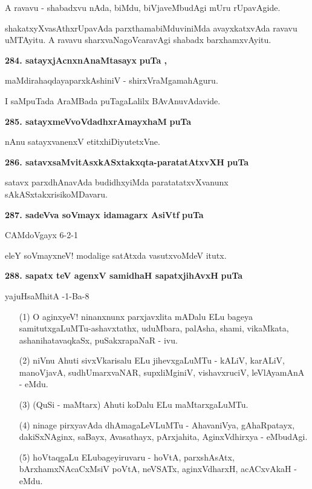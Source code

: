 A ravavu - shabadxvu nAda, biMdu, biVjaveMbudAgi mUru rUpavAgide.

shakatxyXvasAthxrUpavAda parxthamabiMduviniMda avayxkatxvAda ravavu uMTAyitu. A ravavu sharxvaNa\-goVcara\-vAgi shabadx barxhamxvAyitu.

\medskip
\noindent
\textbf{284. satayxjAcnxnAnaMtasayx} \hfill{\bf puTa \pageref{81}, \pageref{103}}

\hfill{maMdirahaqdayaparxkAshiniV - shirxVraMgamahAguru.}

\smallskip
I saMpuTada AraMBada puTagaLalilx BAvAnuvAdavide.

\medskip
\noindent
\textbf{285. satayxmeVvoVdadhxrAmayxhaM} \hfill{\bf puTa \pageref{92}}

\smallskip
nAnu satayxvanenxV etitxhiDiyutetxVne.

\medskip
\noindent
\textbf{286. satavxsaMvitAsxkASxtakxqta-paratatAtxvXH} \hfill{\bf puTa \pageref{48b}}

\smallskip
satavx parxdhAnavAda budidhxyiMda paratatatxvXvanunx sAkASxtakxrisikoMDavaru.

\medskip
\noindent
\textbf{287. sadeVva soVmayx idamagarx AsiVtf} \hfill{\bf puTa \pageref{74}}

\hfill{CAMdoVgayx 6-2-1}

\smallskip
eleY soVmayxneV! modalige satAtxda vasutxvoMdeV itutx.

\medskip
\noindent
\textbf{288. sapatx teV agenxV samidhaH sapatxjihAvxH} \hfill{\bf puTa \pageref{210}}

\hfill{yajuHsaMhitA -1-Ba-8}

\begin{itemize}
\item[(1)] O aginxyeV! ninanxnunx parxjavxlita mADalu ELu bageya samitutxgaLuMTu-\break ashavxtathx, uduMbara, palAsha, shami, vikaMkata, ashanihatavaqkaSx, puSakxrapaNaR - ivu.
\item[(2)] niVnu Ahuti sivxVkarisalu ELu jihevxgaLuMTu - kALiV, karALiV, manoVjavA, sudhUmarxvaNAR, supxliMginiV, vishavxruciV, leVlAyamAnA - eMdu.
\item[(3)] (QuSi - maMtarx) Ahuti koDalu ELu maMtarxgaLuMTu.
\item[(4)] ninage pirxyavAda dhAmagaLeVLuMTu - AhavaniVya, gAhaRpatayx, dakiSxNAginx, saBayx, Avasathayx, pArx\-jahita, AginxVdhirxya - eMbudAgi.
\item[(5)] hoVtaqgaLu ELubageyiruvaru - hoVtA, parxshAsAtx, bArxhamxNAcaCxMsiV poVtA, neVSATx, aginxVdharxH, acACxvAkaH - eMdu.
\end{itemize}

